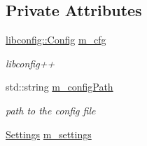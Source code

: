 \subsection*{Private Attributes}
\begin{DoxyCompactItemize}
\item 
\hyperlink{classlibconfig_1_1Config}{libconfig\-::\-Config} \hyperlink{classtld_1_1Config_af86a3db9ddcd73af323b3f8a1e5c7c0e}{m\-\_\-cfg}
\begin{DoxyCompactList}\small\item\em libconfig++ \end{DoxyCompactList}\item 
std\-::string \hyperlink{classtld_1_1Config_a20d627bd78d0dece60cfcbb872daa199}{m\-\_\-config\-Path}
\begin{DoxyCompactList}\small\item\em path to the config file \end{DoxyCompactList}\item 
\hyperlink{classtld_1_1Settings}{Settings} \hyperlink{classtld_1_1Config_a0b6892d71d871a35dec2c718696d47bc}{m\-\_\-settings}
\end{DoxyCompactItemize}
{\bf }\par
